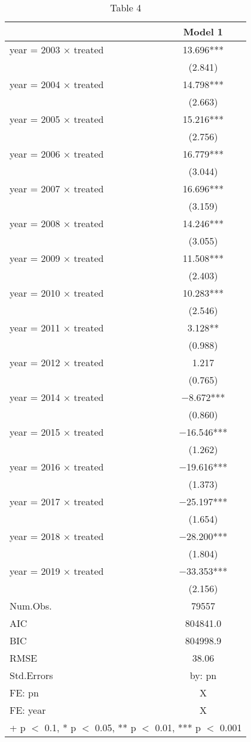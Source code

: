 \begin{table}

\caption{\label{tab:write-results}Table 4}
\centering
\begin{tabular}[t]{lc}
\toprule
  & Model 1\\
\midrule
year = 2003 × treated & \num{13.696}***\\
 & (\num{2.841})\\
year = 2004 × treated & \num{14.798}***\\
 & (\num{2.663})\\
year = 2005 × treated & \num{15.216}***\\
 & (\num{2.756})\\
year = 2006 × treated & \num{16.779}***\\
 & (\num{3.044})\\
year = 2007 × treated & \num{16.696}***\\
 & (\num{3.159})\\
year = 2008 × treated & \num{14.246}***\\
 & (\num{3.055})\\
year = 2009 × treated & \num{11.508}***\\
 & (\num{2.403})\\
year = 2010 × treated & \num{10.283}***\\
 & (\num{2.546})\\
year = 2011 × treated & \num{3.128}**\\
 & (\num{0.988})\\
year = 2012 × treated & \num{1.217}\\
 & (\num{0.765})\\
year = 2014 × treated & \num{-8.672}***\\
 & (\num{0.860})\\
year = 2015 × treated & \num{-16.546}***\\
 & (\num{1.262})\\
year = 2016 × treated & \num{-19.616}***\\
 & (\num{1.373})\\
year = 2017 × treated & \num{-25.197}***\\
 & (\num{1.654})\\
year = 2018 × treated & \num{-28.200}***\\
 & (\num{1.804})\\
year = 2019 × treated & \num{-33.353}***\\
 & (\num{2.156})\\
\midrule
Num.Obs. & \num{79557}\\
AIC & \num{804841.0}\\
BIC & \num{804998.9}\\
RMSE & \num{38.06}\\
Std.Errors & by: pn\\
FE: pn & X\\
FE: year & X\\
\bottomrule
\multicolumn{2}{l}{\rule{0pt}{1em}+ p $<$ 0.1, * p $<$ 0.05, ** p $<$ 0.01, *** p $<$ 0.001}\\
\end{tabular}
\end{table}
